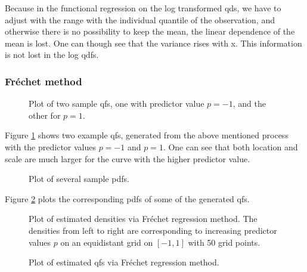 Because in the functional regression on the log transformed qds, we have to adjust with
the range with the individual quantile of the observation, and otherwise there is no
possibility to keep the mean, the linear dependence of the mean is lost. One can though
see that the variance rises with x. This information is not lost in the log qdfs.

\subsubsection{Fréchet method}
\label{sec:app_frechet}

\begin{figure}[h!]
    \centering
    \resizebox{1\textwidth}{!}{}
    \caption[Two sample qfs]{Plot of two sample qfs, one with predictor value $p = -1$,
    and the other for $p = 1$.}
    \label{fig:1stlastqf}
\end{figure}

Figure \ref{fig:1stlastqf} shows two example qfs, generated from the above mentioned
process with the predictor values $p=-1$ and $p=1$. One can see that both location and
scale are much larger for the curve with the higher predictor value.

\begin{figure}[h!]
    \centering
    \resizebox{1\textwidth}{!}{}
    \caption[Several sampled pdfs]{Plot of several sample pdfs.}
    \label{fig:some_densities}
\end{figure}

Figure \ref{fig:some_densities} plots the corresponding pdfs of some of the generated qfs.

\begin{figure}[h!]
    \centering
    \resizebox{1\textwidth}{!}{}
    \caption[Estimated pdfs from Fréchet method]{Plot of estimated densities via Fréchet regression method.
    The densities from left to right are corresponding to increasing predictor values $p$ on an
    equidistant grid on $[-1,1]$ with 50 grid points.}
    \label{fig:frechet_estimates}
\end{figure}

\begin{figure}[h!]
    \centering
    \resizebox{1\textwidth}{!}{}
    \caption[Estimated qfs from Fréchet method]{Plot of estimated qfs via Fréchet regression method.}
    \label{fig:frechet_estimates_3d}
\end{figure}

